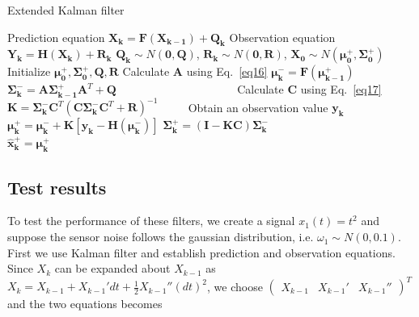 \documentclass[conference]{IEEEtran}
\begin{document}
	\begin{algorithm}
		\caption{Extended Kalman filter}
		\begin{algorithmic}  
			\STATE Prediction equation $\boldsymbol{X_{k}}=\boldsymbol{F}(\boldsymbol{X_{k-1}})+\boldsymbol{Q_{k}}$
			\STATE Observation equation $\boldsymbol{Y_{k}}=\boldsymbol{H}(\boldsymbol{X_{k}})+\boldsymbol{R_{k}}$
			\STATE $\boldsymbol{Q_{k}}\sim N(\boldsymbol{0},\boldsymbol{Q})$, $\boldsymbol{R_{k}}\sim N(\boldsymbol{0},\boldsymbol{R})$, $\boldsymbol{X_{0}}\sim N(\boldsymbol{\mu_{0}^{+}}, \boldsymbol{\Sigma_{0}^{+}})$
			\STATE Initialize $ \boldsymbol{\mu_{0}^{+}}, \boldsymbol{\Sigma_{0}^{+}}, \boldsymbol{Q}, \boldsymbol{R}$
			\STATE Calculate $\boldsymbol{A}$ using Eq.~\ref{eq16}
			\STATE $\boldsymbol{\mu_{k}^{-}}=\boldsymbol{F}(\boldsymbol{\mu_{k-1}^{+}})$ 
			\STATE $\boldsymbol{\Sigma_{k}^{-}}=\boldsymbol{A}\boldsymbol{\Sigma_{k-1}^{+}}\boldsymbol{A}^{T}+\boldsymbol{Q}$ \ \ \ \ \ \ \ \ \ \ \ \ \ \ \ \ \ \ \ \ 
			\STATE Calculate $\boldsymbol{C}$ using Eq.~\ref{eq17}
			\STATE $\boldsymbol{K}=\boldsymbol{\Sigma_{k}^{-}}\boldsymbol{C}^{T}(\boldsymbol{C}\boldsymbol{\Sigma_{k}^{-}}\boldsymbol{C}^{T}+\boldsymbol{R})^{-1}$ \ \ \ \ 	
			\STATE Obtain an observation value $\boldsymbol{y_{k}}$
			\STATE $\boldsymbol{\mu_{k}^{+}}=\boldsymbol{\mu_{k}^{-}}+\boldsymbol{K}[\boldsymbol{y_{k}}-\boldsymbol{H}(\boldsymbol{\mu_{k}^{-}})]$
			\STATE $\boldsymbol{\Sigma_{k}^{+}}=(\boldsymbol{I}-\boldsymbol{KC})\boldsymbol{\Sigma_{k}^{-}}$ \ \ \ \ \ \ \ \ \ \ \ \ \ \ \ \ \ \ \ \ \ \ \ 
			\STATE $\boldsymbol{\hat{x}_{k}^{+}}=\boldsymbol{\mu_{k}^{+}}$
			\ENDFOR
		\end{algorithmic}
	\end{algorithm}
	
	\subsection{Test results}
	
	To test the performance of these filters, we create a signal $x_{1}(t)=t^{2}$ and suppose the sensor noise follows the gaussian distribution, i.e. $\omega_{1} \sim N(0,0.1)$. First we use Kalman filter and establish prediction and observation equations. Since $X_{k}$ can be expanded about $X_{k-1}$ as $X_{k}=X_{k-1}+{X_{k-1}}'dt+\frac{1}{2}{X_{k-1}}''(dt)^{2}$, we choose $\begin{pmatrix}
	X_{k-1} &{X_{k-1}}'  &{X_{k-1}}'' 
	\end{pmatrix}^{T}$ and the two equations becomes
	
\end{document}
